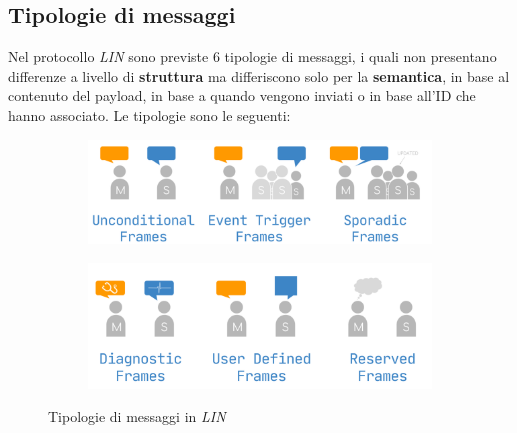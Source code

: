 \subsection{Tipologie di messaggi}
Nel protocollo \emph{LIN} sono previste 6 tipologie di messaggi, i quali non presentano differenze a livello di \textbf{struttura} ma differiscono solo per la \textbf{semantica}, in base al contenuto del payload, in base a quando vengono inviati o in base all'ID che hanno associato. Le tipologie sono le seguenti:

\begin{figure}[h]
    \centering
    \begin{subfigure}{0.7\textwidth}
        \includegraphics[width=1\textwidth]{capitoli/figure-protocolli/lin-frames-1.png}
    \end{subfigure}
    \begin{subfigure}{0.7\textwidth}
        \includegraphics[width=1\textwidth]{capitoli/figure-protocolli/lin-frames-2.png}
    \end{subfigure}
    \caption{Tipologie di messaggi in \emph{LIN}}
    \label{fig:lin-frames}
\end{figure}

